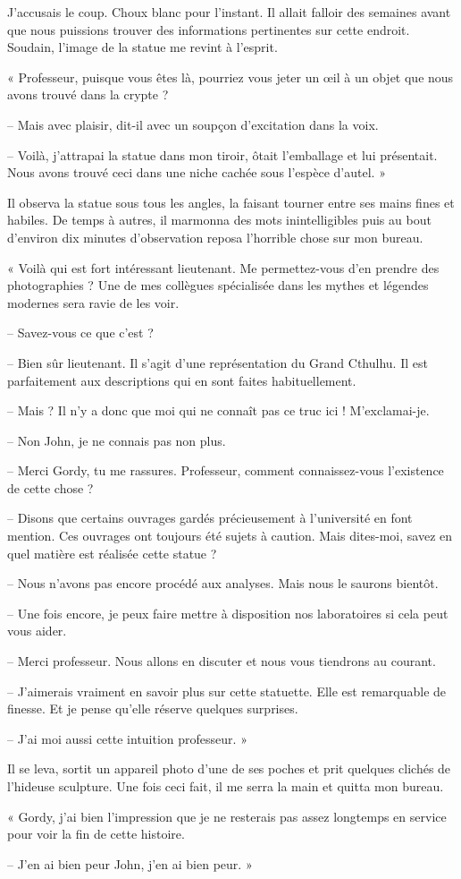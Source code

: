 J'accusais le coup. Choux blanc pour l'instant. Il allait falloir des semaines avant que nous puissions trouver des
informations pertinentes sur cette endroit. Soudain, l'image de la statue me revint à l'esprit.

« Professeur, puisque vous êtes là, pourriez vous jeter un œil à un objet que nous avons trouvé dans la crypte ?

-- Mais avec plaisir, dit-il avec un soupçon d'excitation dans la voix.

-- Voilà, j'attrapai la statue dans mon tiroir, ôtait l'emballage et lui présentait. Nous avons trouvé ceci dans une
niche cachée sous l'espèce d'autel. »

Il observa la statue sous tous les angles, la faisant tourner entre ses mains fines et habiles. De temps à autres, il
marmonna des mots inintelligibles puis au bout d'environ dix minutes d'observation reposa l'horrible chose sur mon
bureau.

« Voilà qui est fort intéressant lieutenant. Me permettez-vous d'en prendre des photographies ? Une de mes collègues
spécialisée dans les mythes et légendes modernes sera ravie de les voir.

-- Savez-vous ce que c'est ?

-- Bien sûr lieutenant. Il s'agit d'une représentation du Grand Cthulhu. Il est parfaitement aux descriptions qui en
sont faites habituellement.

-- Mais ? Il n'y a donc que moi qui ne connaît pas ce truc ici ! M'exclamai-je.

-- Non John, je ne connais pas non plus.

-- Merci Gordy, tu me rassures. Professeur, comment connaissez-vous l'existence de cette chose ?

-- Disons que certains ouvrages gardés précieusement à l'université en font mention. Ces ouvrages ont toujours été
sujets à caution. Mais dites-moi, savez en quel matière est réalisée cette statue ?

-- Nous n'avons pas encore procédé aux analyses. Mais nous le saurons bientôt.

-- Une fois encore, je peux faire mettre à disposition nos laboratoires si cela peut vous aider.

-- Merci professeur. Nous allons en discuter et nous vous tiendrons au courant.

-- J'aimerais vraiment en savoir plus sur cette statuette. Elle est remarquable de finesse. Et je pense qu'elle réserve
quelques surprises.

-- J'ai moi aussi cette intuition professeur. »

Il se leva, sortit un appareil photo d'une de ses poches et prit quelques clichés de l'hideuse sculpture. Une fois ceci
fait, il me serra la main et quitta mon bureau.

« Gordy, j'ai bien l'impression que je ne resterais pas assez longtemps en service pour voir la fin de cette histoire.

-- J'en ai bien peur John, j'en ai bien peur. »
